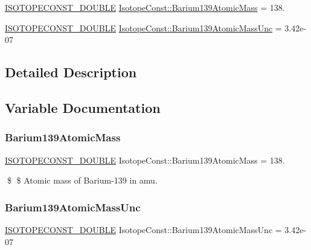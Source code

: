 \begin{DoxyCompactItemize}
\item 
\mbox{\hyperlink{group___isotope_const-_macros_ga8f45a7272ce02c0b4c65c44636ed719a}{I\+S\+O\+T\+O\+P\+E\+C\+O\+N\+S\+T\+\_\+\+D\+O\+U\+B\+LE}} \mbox{\hyperlink{group___isotope_const-_barium-_ba139_ga167ac1a9e747642f527dcde7b4a09400}{Isotope\+Const\+::\+Barium139\+Atomic\+Mass}} = 138.
\item 
\mbox{\hyperlink{group___isotope_const-_macros_ga8f45a7272ce02c0b4c65c44636ed719a}{I\+S\+O\+T\+O\+P\+E\+C\+O\+N\+S\+T\+\_\+\+D\+O\+U\+B\+LE}} \mbox{\hyperlink{group___isotope_const-_barium-_ba139_gada79422be40fd071b94a9e3917d8abbb}{Isotope\+Const\+::\+Barium139\+Atomic\+Mass\+Unc}} = 3.\+42e-\/07
\end{DoxyCompactItemize}


\subsection{Detailed Description}


\subsection{Variable Documentation}
\mbox{\label{group___isotope_const-_barium-_ba139_ga167ac1a9e747642f527dcde7b4a09400}} 
\subsubsection{\texorpdfstring{Barium139\+Atomic\+Mass}{Barium139AtomicMass}}
{\footnotesize\ttfamily \mbox{\hyperlink{group___isotope_const-_macros_ga8f45a7272ce02c0b4c65c44636ed719a}{I\+S\+O\+T\+O\+P\+E\+C\+O\+N\+S\+T\+\_\+\+D\+O\+U\+B\+LE}} Isotope\+Const\+::\+Barium139\+Atomic\+Mass = 138.}

\$ \$ Atomic mass of Barium-\/139 in amu. \mbox{\label{group___isotope_const-_barium-_ba139_gada79422be40fd071b94a9e3917d8abbb}} 
\subsubsection{\texorpdfstring{Barium139\+Atomic\+Mass\+Unc}{Barium139AtomicMassUnc}}
{\footnotesize\ttfamily \mbox{\hyperlink{group___isotope_const-_macros_ga8f45a7272ce02c0b4c65c44636ed719a}{I\+S\+O\+T\+O\+P\+E\+C\+O\+N\+S\+T\+\_\+\+D\+O\+U\+B\+LE}} Isotope\+Const\+::\+Barium139\+Atomic\+Mass\+Unc = 3.\+42e-\/07}

